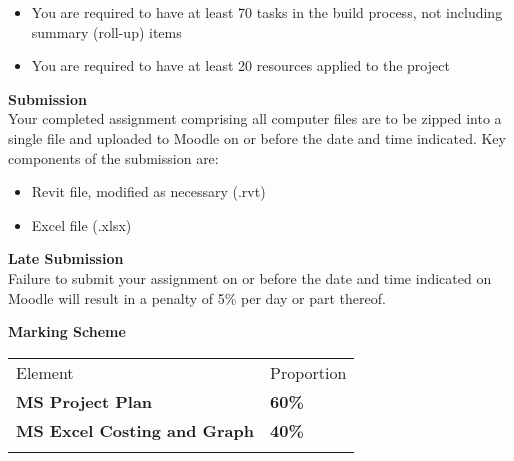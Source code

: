 \begin{itemize}
	\item You are required to have at least 70 tasks in the build process, not including summary (roll-up) items
	\item You are required to have at least 20 resources applied to the project
\end{itemize}




\newpage


\textbf{Submission}\\
Your completed assignment comprising all computer files are to be zipped into a single file and uploaded to Moodle on or before the date and time indicated.  Key components of the submission are:
\begin{itemize}
	\item Revit file, modified as necessary (.rvt)
	\item Excel file (.xlsx)
\end{itemize}




\textbf{Late Submission}\\
Failure to submit your assignment on or before the date and time indicated on Moodle will result in a penalty of 5\% per day or part thereof.

\vspace{0.5cm}
\textbf{Marking Scheme}

\begin{table}[h!]
     \begin{center}
     \begin{tabular}{p{5cm}  p{5cm} }
     \toprule
      \textbf\large{Element} & \textbf\large{Proportion} \\ 
    \cmidrule(r){1-1}\cmidrule(lr){2-2}
      \textbf{MS Project Plan } & \textbf{60\%}\\
      \textbf{MS Excel Costing and Graph} & \textbf{40\%}\\
      \\ \bottomrule
      \end{tabular}
      \label{tbl:markSchemeAsmt3}
      \end{center}
 \end{table}


